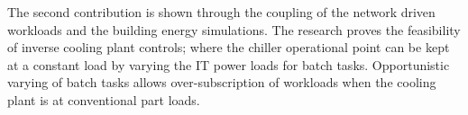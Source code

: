 The second contribution is shown through the coupling of the network driven workloads and the building energy simulations. The research proves the feasibility of inverse cooling plant controls; where the chiller operational point can be kept at a constant load by varying the IT power loads for batch tasks. Opportunistic varying of batch tasks allows over-subscription of workloads when the cooling plant is at conventional part loads.